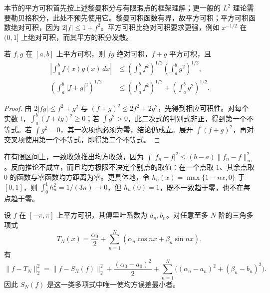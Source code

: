 本节的平方可积首先按上述黎曼积分与有限瑕点的框架理解；更一般的 $L^2$ 理论需要勒贝格积分，此处不预先使用它。黎曼可积函数有界，故平方可积；平方可积函数绝对可积，因为 $2|f|\leq1+f^2$。平方可积比绝对可积要求更强，例如 $x^{-1/2}$ 在 $(0,1]$ 上绝对可积，而其平方的积分发散。

\begin{proposition}[积分型柯西不等式与三角不等式]
\label{prop:square-integral-inequalities}
若 $f,g$ 在 $[a,b]$ 上平方可积，则 $fg$ 绝对可积，$f+g$ 平方可积，且
\begin{align}
    \left|\int_a^bf(x)g(x)\,dx\right|
       &\leq\left(\int_a^bf^2\right)^{1/2}
              \left(\int_a^bg^2\right)^{1/2},
       \label{eq:integral-cauchy-schwarz-fourier}\\
    \left(\int_a^b|f+g|^2\right)^{1/2}
       &\leq\left(\int_a^bf^2\right)^{1/2}
                 +\left(\int_a^bg^2\right)^{1/2}.
       \label{eq:integral-triangle-fourier}
\end{align}
\end{proposition}

\begin{proof}
由 $2|fg|\leq f^2+g^2$ 与 $(f+g)^2\leq2f^2+2g^2$，先得到相应可积性。对每个实数 $t$，$\int_a^b(f+tg)^2\geq0$；若 $\int g^2>0$，此二次式的判别式非正，得到第一个不等式。若 $\int g^2=0$，其一次项也必须为零，结论仍成立。展开 $\int(f+g)^2$，再对交叉项使用第一个不等式，即得第二个不等式。
\end{proof}

在有限区间上，一致收敛推出均方收敛，因为 $\int|f_n-f|^2\leq(b-a)\|f_n-f\|_\infty^2$。反向推论不成立，而且均方极限不决定个别点的取值：在一个点取 $1$、其余点取 $0$ 的函数与零函数均方距离为零。更具体地，令 $h_n(x)=\max\{1-nx,0\}$ 于 $[0,1]$，则 $\int_0^1h_n^2=1/(3n)\to0$，但 $h_n(0)=1$，既不一致趋于零，也不在每点趋于零。

\begin{theorem}[傅里叶部分和的最佳均方逼近]
\label{thm:fourier-best-square-approximation}
设 $f$ 在 $[-\pi,\pi]$ 上平方可积，其傅里叶系数为 $a_n,b_n$。对任意至多 $N$ 阶的三角多项式
\[
    T_N(x)=\frac{\alpha_0}{2}
             +\sum_{n=1}^N(\alpha_n\cos nx+\beta_n\sin nx),
\]
有
\begin{equation}
    \|f-T_N\|_2^2=\|f-S_N(f)\|_2^2
            +\frac{(\alpha_0-a_0)^2}{2}
            +\sum_{n=1}^N\bigl((\alpha_n-a_n)^2+(\beta_n-b_n)^2\bigr).
    \label{eq:fourier-square-error-decomposition}
\end{equation}
因此 $S_N(f)$ 是这一类多项式中唯一使均方误差最小者。
\end{theorem}

